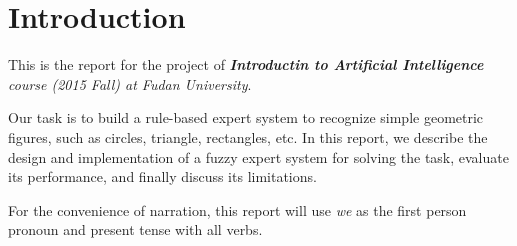 \section{Introduction}

This is the report for the project of \textit{\textbf{Introductin to Artificial Intelligence} course (2015 Fall) at Fudan University}.

Our task is to build a rule-based expert system to recognize simple geometric figures, such as circles, triangle, rectangles, etc. In this report, we describe the design and implementation of a fuzzy expert system for solving the task, evaluate its performance, and finally discuss its limitations.

For the convenience of narration, this report will use \textit{we} as the first person pronoun and present tense with all verbs.
